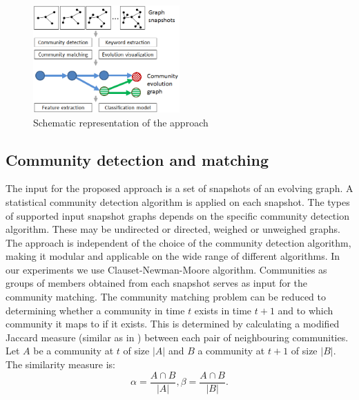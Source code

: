 \documentclass{article} %
\begin{document}
\begin{figure}\label{architecture}
   	\begin{center}
   	\includegraphics[width=0.5\textwidth]{architecture.png}
   	\end{center}
   	\caption{Schematic representation of the approach}
\end{figure}
\subsection{Community detection and matching}
The input for the proposed approach is a set of snapshots of an evolving graph. A statistical community detection algorithm is applied on each snapshot. The types of supported input snapshot graphs depends on the specific community detection algorithm. These may be  undirected or directed, weighed or unweighed graphs. The approach is independent of the choice of the community detection algorithm, making it modular and applicable on the wide range of different algorithms. In our experiments we use Clauset-Newman-Moore\cite{clauset-newman-moore} algorithm. Communities as groups of members obtained from each snapshot serves as input for the community matching. The community matching problem can be reduced to determining whether a community in time $t$ exists in time $t+1$ and to which community it maps to if it exists. This is determined by calculating a modified Jaccard measure (similar as in \cite{gliwa2013})  between each pair of neighbouring communities. Let  $A$ be a community at $t$ of size $|A|$ and $B$ a community at $t+1$ of size $|B|$. The similarity measure is:
\begin{equation}
\alpha = \frac{A\cap B}{|A|},
\beta = \frac{A\cap B}{|B|}.
\end{equation}
\end{document}
